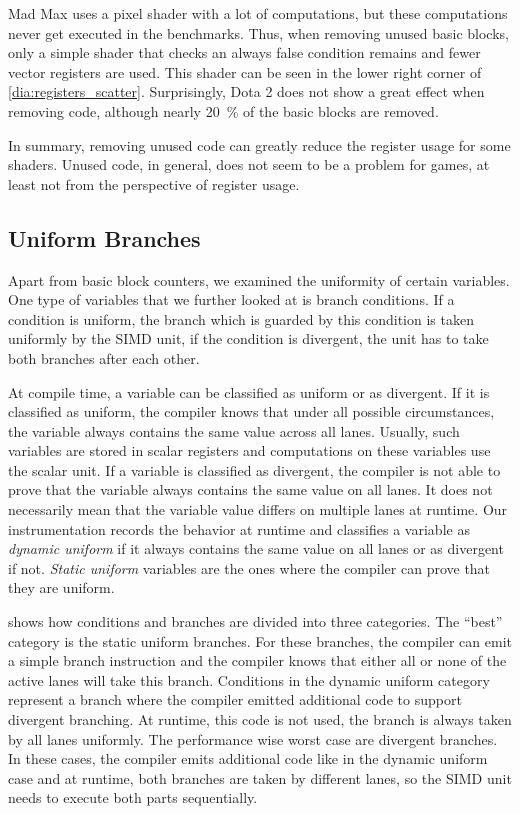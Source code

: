 Mad Max uses a pixel shader with a lot of computations, but these computations never get executed in the benchmarks.
Thus, when removing unused basic blocks, only a simple shader that checks an always false condition remains and fewer vector registers are used.
This shader can be seen in the lower right corner of \cref{dia:registers_scatter}.
Surprisingly, Dota 2 does not show a great effect when removing code, although nearly \SI{20}{\percent} of the basic blocks are removed.

In summary, removing unused code can greatly reduce the register usage for some shaders.
Unused code, in general, does not seem to be a problem for games, at least not from the perspective of register usage.

\subsection{Uniform Branches}
\label{sub:eval_uniform_branches}
Apart from basic block counters, we examined the uniformity of certain variables.
One type of variables that we further looked at is branch conditions.
If a condition is uniform, the branch which is guarded by this condition is taken uniformly by the SIMD unit, if the condition is divergent, the unit has to take both branches after each other.

At compile time, a variable can be classified as uniform or as divergent.
If it is classified as uniform, the compiler knows that under all possible circumstances, the variable always contains the same value across all lanes.
Usually, such variables are stored in scalar registers and computations on these variables use the scalar unit.
If a variable is classified as divergent, the compiler is not able to prove that the variable always contains the same value on all lanes.
It does not necessarily mean that the variable value differs on multiple lanes at runtime.
Our instrumentation records the behavior at runtime and classifies a variable as \emph{dynamic uniform} if it always contains the same value on all lanes or as divergent if not.
\emph{Static uniform} variables are the ones where the compiler can prove that they are uniform.



 shows how conditions and branches are divided into three categories.
The \enquote{best} category is the static uniform branches.
For these branches, the compiler can emit a simple branch instruction and the compiler knows that either all or none of the active lanes will take this branch.
Conditions in the dynamic uniform category represent a branch where the compiler emitted additional code to support divergent branching.
At runtime, this code is not used, the branch is always taken by all lanes uniformly.
The performance wise worst case are divergent branches.
In these cases, the compiler emits additional code like in the dynamic uniform case and at runtime, both branches are taken by different lanes, so the SIMD unit needs to execute both parts sequentially.

